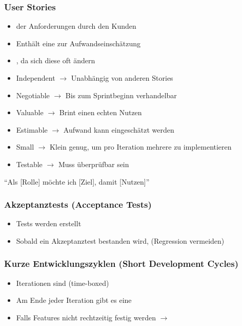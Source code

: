 \subsubsection*{User Stories}
\begin{itemize}
    \item {} der Anforderungen durch den Kunden
    \item Enthält eine  zur Aufwandseinschätzung
    \item {}, da sich diese oft ändern
\end{itemize}
\begin{itemize}
    \item Independent $\rightarrow$ Unabhängig von anderen Stories
    \item Negotiable $\rightarrow$ Bis zum Sprintbeginn verhandelbar
    \item Valuable $\rightarrow$ Brint einen echten Nutzen
    \item Estimable $\rightarrow$ Aufwand kann eingeschätzt werden
    \item Small $\rightarrow$ Klein genug, um pro Iteration mehrere zu implementieren
    \item Testable $\rightarrow$ Muss überprüfbar sein
\end{itemize}
 \enquote{Als [Rolle] möchte ich [Ziel], damit [Nutzen]}
\subsubsection*{Akzeptanztests (Acceptance Tests)}
\begin{itemize}
    \item Tests werden  erstellt
    \item Sobald ein Akzeptanztest bestanden wird,  (Regression vermeiden)
\end{itemize}
\subsubsection*{Kurze Entwicklungszyklen (Short Development Cycles)}
\begin{itemize}
    \item Iterationen sind  (time-boxed)
    \item Am Ende jeder Iteration gibt es eine 
    \item Falls Features nicht rechtzeitig festig werden $\rightarrow$ 
\end{itemize}
